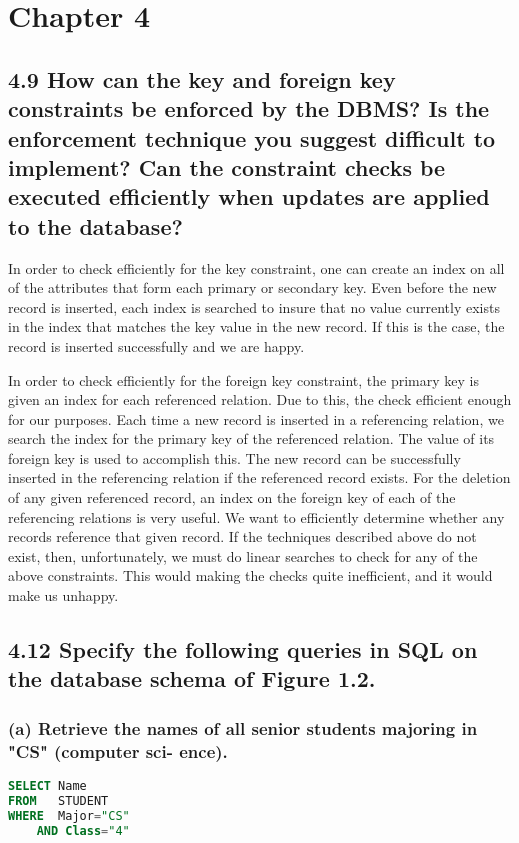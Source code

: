 \section*{Chapter 4}

\subsection*{4.9 How can the key and foreign key constraints be enforced by the DBMS? Is the enforcement technique you suggest difficult to implement? Can the constraint checks be executed efficiently when updates are applied to the database?}

In order to check efficiently for the key constraint, one can create an index on all of the attributes that form each primary or secondary key. Even before the new record is inserted, each index is searched to insure that no value currently exists in the index that matches the key value in the new record. If this is the case, the record is inserted successfully and we are happy.

In order to check efficiently for the foreign key constraint, the primary key is given an index for each referenced relation. Due to this, the check efficient enough for our purposes. Each time a new record is inserted in a referencing relation, we search the index for the primary key of the referenced relation. The value of its foreign key is used to accomplish this. The new record can be successfully inserted in the referencing relation if the referenced record exists. For the deletion of any given referenced record, an index on the foreign key of each of the referencing relations is very useful. We want to efficiently determine whether any records reference that given record. If the techniques described above do not exist, then, unfortunately, we must do linear searches to check for any of the above constraints. This would making the checks quite inefficient, and it would make us unhappy.


\subsection*{4.12 Specify the following queries in SQL on the database schema of Figure 1.2.}
\subsubsection*{(a) Retrieve the names of all senior students majoring in "CS" (computer sci- ence).}
\begin{lstlisting}[language=SQL]
SELECT Name 
FROM   STUDENT
WHERE  Major="CS"
    AND Class="4"
\end{lstlisting}

